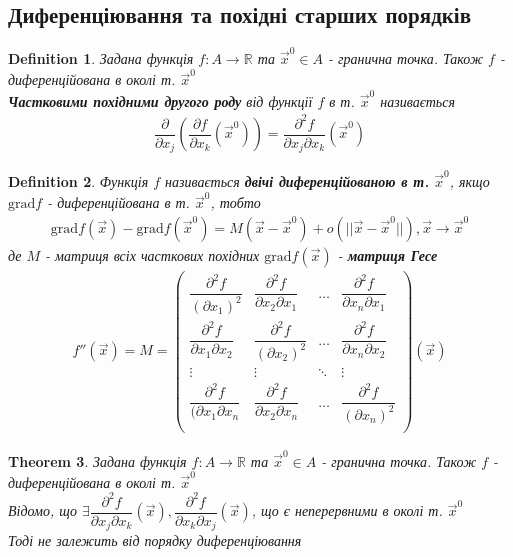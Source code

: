 \documentclass[a4paper, 14pt]{extarticle}
\theoremstyle{theoremdd}
\newtheorem{theorem}{Theorem}[subsection]
\theoremstyle{theoremdd}
\newtheorem{definition}[theorem]{Definition}
\theoremstyle{theoremdd}
\theoremstyle{theoremdd}
\theoremstyle{theoremdd}
\theoremstyle{theoremdd}
\theoremstyle{theoremdd}
\begin{document}
\subsection{Диференціювання та похідні старших порядків}
\begin{definition}
Задана функція $f: A \to \mathbb{R}$ та $\vec{x}^0 \in A$ - гранична точка. Також $f$ - диференційована в околі т. $\vec{x}^0$\\
\textbf{Частковими похідними другого роду} від функції $f$ в т. $\vec{x}^0$ називається
\begin{align*}
\dfrac{\partial}{\partial x_j} \left( \dfrac{\partial f}{\partial x_k} (\vec{x}^0) \right) = \dfrac{\partial^2 f}{\partial x_j \partial x_k} (\vec{x}^0)
\end{align*}
\end{definition}

\begin{definition}
Функція $f$ називається \textbf{двічі диференційованою в т.} $\vec{x}^0$, якщо $\textrm{grad} f$ - диференційована в т. $\vec{x}^0$, тобто
\begin{align*}
\textrm{grad} f(\vec{x}) - \textrm{grad} f(\vec{x}^0) = M(\vec{x} - \vec{x}^0) + o(|| \vec{x}-\vec{x}^0||), \vec{x} \to \vec{x}^0
\end{align*}
де $M$ - матриця всіх часткових похідних $\textrm{grad} f(\vec{x})$ - \textbf{матриця Гесе}
\begin{align*}
f''(\vec{x}) = M = \begin{pmatrix}
\dfrac{\partial^2 f}{(\partial x_1)^2} & \dfrac{\partial^2 f}{\partial x_2 \partial x_1} & \dots & \dfrac{\partial^2 f}{\partial x_n \partial x_1} \\
\dfrac{\partial^2 f}{\partial x_1 \partial x_2} & \dfrac{\partial^2 f}{(\partial x_2)^2} & \dots & \dfrac{\partial^2 f}{\partial x_n \partial x_2} \\
\vdots & \vdots & \ddots & \vdots \\
\dfrac{\partial^2 f}{(\partial x_1 \partial x_n} & \dfrac{\partial^2 f}{\partial x_2 \partial x_n} & \dots & \dfrac{\partial^2 f}{(\partial x_n)^2} \\
\end{pmatrix}(\vec{x})
\end{align*}
\end{definition}

\begin{theorem}
Задана функція $f: A \to \mathbb{R}$ та $\vec{x}^0 \in A$ - гранична точка. Також $f$ - диференційована в околі т. $\vec{x}^0$\\
Відомо, що $\exists \dfrac{\partial^2 f}{\partial x_j \partial x_k} (\vec{x}), \dfrac{\partial^2 f}{\partial x_k \partial x_j} (\vec{x})$, що є неперервними в околі т. $\vec{x}^0$\\
Тоді не залежить від порядку диференціювання
\end{theorem}
\end{document}

